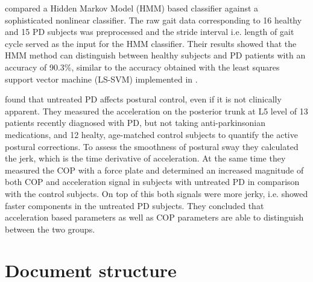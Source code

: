 \citeauthor{khorasani_hmm_2014} \cite{khorasani_hmm_2014} compared a Hidden Markov Model (HMM) based classifier against a sophisticated nonlinear classifier. The raw gait data corresponding to 16 healthy and 15 PD subjects was preprocessed and the stride interval i.e. length of gait cycle served as the input for the HMM classifier. Their results showed that the HMM method can distinguish between healthy subjects and PD patients with an accuracy of 90.3\%, similar to the accuracy obtained with the least squares support vector machine (LS-SVM) implemented in \cite{wu_statistical_2010}.

\citeauthor{mancini_isway:_2012} \cite{mancini_isway:_2012} found that untreated PD affects postural control, even if it is not clinically apparent. They measured the acceleration on the posterior trunk at L5 level of 13 patients recently diagnosed with PD, but not taking anti-parkinsonian medications, and 12 healty, age-matched control subjects to quantify the active postural corrections. To assess the smoothness of postural sway they calculated the jerk, which is the time derivative of acceleration. At the same time they measured the COP with a force plate and determined an increased magnitude of both COP and acceleration signal in subjects with untreated PD in comparison with the control subjects. On top of this both signals were more jerky, i.e. showed faster components in the untreated PD subjects. They concluded that acceleration based parameters as well as COP parameters are able to distinguish between the two groups. 



\section{Document structure}

